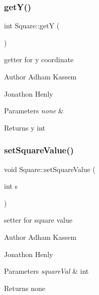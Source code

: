 \subsubsection{\texorpdfstring{get\+Y()}{getY()}}
{\footnotesize\ttfamily int Square\+::getY (\begin{DoxyParamCaption}{ }\end{DoxyParamCaption})\hspace{0.3cm}{\ttfamily [inline]}}

getter for y coordinate \begin{DoxyAuthor}{Author}
Adham Kassem 

Jonathon Henly 
\end{DoxyAuthor}

\begin{DoxyParams}{Parameters}
{\em none} & \\
\hline
\end{DoxyParams}
\begin{DoxyReturn}{Returns}
y int 
\end{DoxyReturn}
\mbox{\label{classSquare_aeb716f4ab553e505806929e43c130396}} 
\subsubsection{\texorpdfstring{set\+Square\+Value()}{setSquareValue()}}
{\footnotesize\ttfamily void Square\+::set\+Square\+Value (\begin{DoxyParamCaption}\item[{int}]{s }\end{DoxyParamCaption})\hspace{0.3cm}{\ttfamily [inline]}}

setter for square value \begin{DoxyAuthor}{Author}
Adham Kassem 

Jonathon Henly 
\end{DoxyAuthor}

\begin{DoxyParams}{Parameters}
{\em square\+Val} & int \\
\hline
\end{DoxyParams}
\begin{DoxyReturn}{Returns}
none 
\end{DoxyReturn}
\mbox{\label{classSquare_a293b509400700682b1774ce5800e2b04}} 
